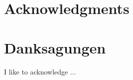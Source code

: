 {%
	\chapter*{Acknowledgments}
}
{%
	\chapter*{Danksagungen}
}
\thispagestyle{empty}

I like to acknowledge ...